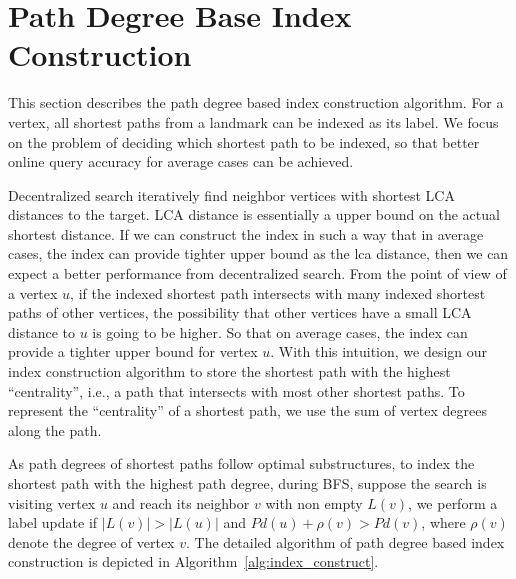 \section{Path Degree Base Index Construction}
\label{preprocessing}

This section describes the path degree based index construction algorithm. For a vertex, all shortest paths from a landmark can be indexed as its label. We focus on the problem of deciding which shortest path to be indexed, so that better online query accuracy for average cases can be achieved. 


Decentralized search iteratively find neighbor vertices with shortest LCA distances to the target. LCA distance is essentially a upper bound on the actual shortest distance. If we can construct the index in such a way that in average cases, the index can provide tighter upper bound as the lca distance, then we can expect a better performance from decentralized search. From the point of view of a vertex $u$, if the indexed shortest path intersects with many indexed shortest paths of other vertices, the possibility that other vertices have a small LCA distance to $u$ is going to be higher. So that on average cases, the index can provide a tighter upper bound for vertex $u$. With this intuition, we design our index construction algorithm to store the shortest path with the highest ``centrality'', i.e., a path that intersects with most other shortest paths. To represent the ``centrality'' of a shortest path, we use the sum of vertex degrees along the path. %

As path degrees of shortest paths follow optimal substructures, 
to index the shortest path with the highest path degree, during BFS, suppose the search is visiting vertex $u$ and reach its neighbor $v$ with non empty $L(v)$, we perform a label update if $|L(v)| > |L(u)|$ and $Pd(u) + \rho(v) > Pd(v)$, where $\rho(v)$ denote the degree of vertex $v$. The detailed algorithm of path degree based index construction is depicted in Algorithm~\ref{alg:index_construct}. 

